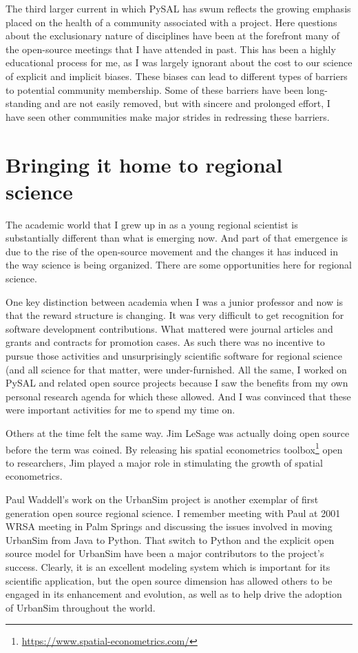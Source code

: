 \documentclass[11pt]{article}
\begin{document}
The third larger current in which PySAL has swum reflects the growing emphasis
placed on the health of a community associated with a project. Here questions
about the exclusionary nature of disciplines have been at the forefront many of
the open-source meetings that I have attended in past. This has been a highly
educational process for me, as I was largely ignorant about the cost to our
science of explicit and implicit biases. These biases can lead to different
types of barriers to potential community membership. Some of these barriers
have been long-standing and are not easily removed, but with sincere and
prolonged effort, I have seen other communities make major strides in
redressing these barriers.
\section*{Bringing it home to regional science}
\label{sec:org2bffd42}
The academic world that I grew up in as a young regional scientist is
substantially different than what is emerging now. And part of that emergence
is due to the rise of the open-source movement and the changes it has induced in
the way science is being organized. There are some opportunities here for
regional science.

One key distinction between academia when I was a junior professor and now is
that the reward structure is changing. It was very difficult to get recognition
for software development contributions. What mattered were journal articles and
grants and contracts for promotion cases. As such there was no incentive to
pursue those activities and unsurprisingly scientific software for regional
science (and all science for that matter, were under-furnished. All the same, I
worked on PySAL and related open source projects because I saw the benefits
from my own personal research agenda for which these allowed. And I was
convinced that these were important activities for me to spend my time on.

Others at the time felt the same way. Jim LeSage was actually doing open
source before the term was coined. By releasing his spatial econometrics
toolbox\footnote{\url{https://www.spatial-econometrics.com/}} open to researchers, Jim played a major role in stimulating the growth
of spatial econometrics.


Paul Waddell's work on the UrbanSim project \citep{waddell_urbansim:_2002} is
another exemplar of first generation open source regional science. I remember
meeting with Paul at 2001 WRSA meeting in Palm Springs and discussing the
issues involved in moving UrbanSim from Java to Python. That switch to
Python and the explicit open source model for UrbanSim have been a major
contributors to the project's success. Clearly, it is an excellent modeling
system which is important for its scientific application, but the open source
dimension has allowed others to be engaged in its enhancement and evolution, as
well as to help drive the adoption of UrbanSim throughout the world.
\end{document}
